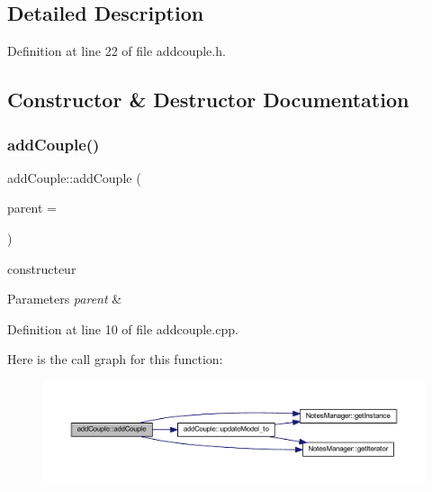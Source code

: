 \subsection{Detailed Description}


Definition at line 22 of file addcouple.\+h.



\subsection{Constructor \& Destructor Documentation}
\mbox{\label{classadd_couple_a5c478c6e07cd0b9639c4c84687c89764}} 
\subsubsection{\texorpdfstring{add\+Couple()}{addCouple()}}
{\footnotesize\ttfamily add\+Couple\+::add\+Couple (\begin{DoxyParamCaption}\item[{Q\+Widget $\ast$}]{parent = {} }\end{DoxyParamCaption})\hspace{0.3cm}{\ttfamily [explicit]}}



constructeur 


\begin{DoxyParams}{Parameters}
{\em parent} & \\
\hline
\end{DoxyParams}


Definition at line 10 of file addcouple.\+cpp.

Here is the call graph for this function\+:\nopagebreak
\begin{figure}[H]
\begin{center}
\leavevmode
\includegraphics[width=350pt]{classadd_couple_a5c478c6e07cd0b9639c4c84687c89764_cgraph}
\end{center}
\end{figure}


